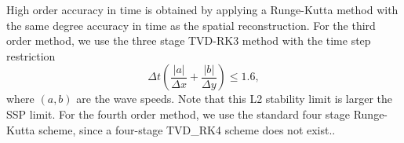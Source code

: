 High order accuracy in time is obtained by applying a Runge-Kutta method   
with the same degree accuracy in time  as the spatial reconstruction.
For the third order method, we use the three stage TVD-RK3 method
with the time step restriction
\begin{equation}
\Delta t \left( \frac{|a|}{\Delta x} + \frac{|b|}{\Delta y} \right) \leq 1.6,
\end{equation}
where $(a,b)$ are the wave speeds.
Note that this L2 stability limit is larger the SSP limit.
For the fourth order method, we use the standard four stage Runge-Kutta
scheme, since a four-stage TVD\_RK4 scheme does not exist..

